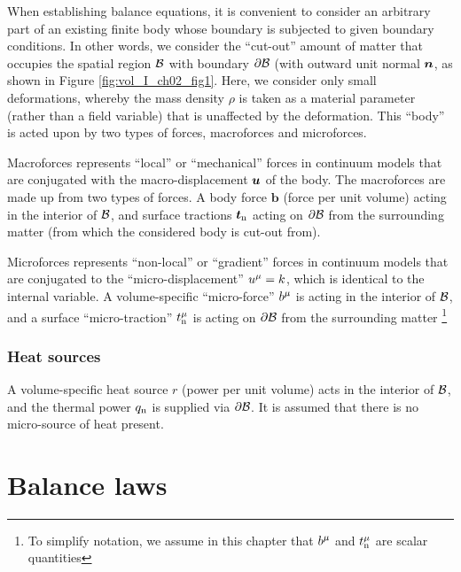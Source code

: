 When establishing balance equations, it is convenient to consider an arbitrary part
of an existing finite body whose boundary is subjected to given boundary 
conditions. In other words, we consider the ``cut-out'' amount of matter that 
occupies the spatial region $\body$ with boundary  
$\boundary$ (with outward unit normal $\normal$, as shown in Figure
\ref{fig:vol_I_ch02_fig1}. Here, we consider only small deformations, whereby
the mass density $\rho$ is taken as a material parameter
(rather than a field variable) that is unaffected by the deformation. 
This ``body'' is acted upon by two types of forces, macroforces and microforces.

\begin{definition}[Macroforces]
Macroforces represents ``local'' or ``mechanical'' forces in continuum models
 that are conjugated with the macro-displacement $\u$ of the body. 
The macroforces are made up from two types of forces. A body force ${\bm b}$ 
(force per unit volume) acting in 
the interior of $\body$, and surface tractions $\tract$  
acting on $\boundary$ from the surrounding matter 
(from which the considered body is cut-out from).
\end{definition}

\begin{definition}[Microforces]
Microforces represents ``non-local'' or ``gradient'' forces in continuum models
that are conjugated to the ``micro-displacement'' $u^\micro=k$,
which is identical to the internal variable. 
A volume-specific ``micro-force'' $b^\micro$ is acting in the interior 
of $\body$, and a surface ``micro-traction'' $\microtract$
is acting on $\boundary$ from the surrounding matter
\footnote{To simplify notation, we assume in this chapter that $b^\micro$ 
and $\microtract$ are scalar 
quantities}
\end{definition}

\subsubsection{Heat sources}
A volume-specific heat source $r$ (power per unit volume) acts in the interior
of $\body$, and the thermal power $q_\subn$ is supplied
via $\boundary$. 
It is assumed that there is no micro-source of heat present.

\section{Balance laws}


